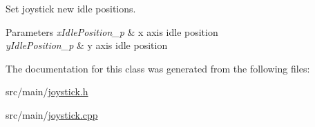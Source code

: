 Set joystick new idle positions. 


\begin{DoxyParams}{Parameters}
{\em x\+Idle\+Position\+\_\+p} & x axis idle position \\
\hline
{\em y\+Idle\+Position\+\_\+p} & y axis idle position \\
\hline
\end{DoxyParams}


The documentation for this class was generated from the following files\+:\begin{DoxyCompactItemize}
\item 
src/main/\hyperlink{joystick_8h}{joystick.\+h}\item 
src/main/\hyperlink{joystick_8cpp}{joystick.\+cpp}\end{DoxyCompactItemize}
